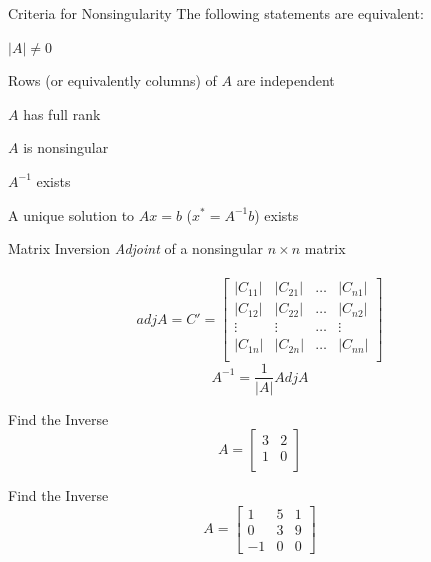\documentclass{./../../Latex/teaching_slides}
\begin{document}
 \begin{frame}{Criteria for Nonsingularity}
 The following statements are equivalent:
 
 \begin{witemize}
  \item $|A| \neq 0 $
  \item Rows (or equivalently columns) of $A$ are independent
  \item $A$ has full rank
  \item $A$ is nonsingular
  \item $A^{-1}$ exists
  \item A unique solution to $A x=b$ ($x^*=A^{-1}b$) exists
\end{witemize}

\end{frame}

 
 \begin{frame}{Matrix Inversion}
 \textit{Adjoint} of a nonsingular $n \times n$ matrix \\~\\
 $$adj A = C' = \left[\begin{array}{llll}
|C_{11}| & |C_{21}| & \hdots & |C_{n1}| \\
|C_{12}| & |C_{22}| & \hdots &  |C_{n2}| \\
\vdots &\vdots & \hdots &  \vdots \\
|C_{1n}| & |C_{2n}| & \hdots & |C_{nn}| \\
\end{array}\right]$$
\vspace{1em}
$$ A^{-1} = \frac{1}{|A|} Adj A$$
 \end{frame}

 \begin{frame}{Find the Inverse}
$$
A=\left[\begin{array}{ccc}
3 & 2 \\
1 & 0 \\
\end{array}\right]
$$
 \end{frame}

 \begin{frame}{Find the Inverse}
\[
A=\left[\begin{array}{ccc}
1 & 5 & 1 \\
0 & 3 & 9 \\
-1 & 0 & 0
\end{array}\right]
\]
 \end{frame}
\end{document}

